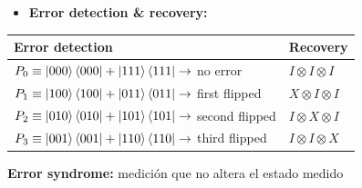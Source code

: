 \documentclass[10pt]{beamer}
\theoremstyle{remark}
\theoremstyle{definition}
\begin{document}
\begin{frame}[allowframebreaks]
    \framebreak

    \begin{itemize}
        \item \textbf{Error detection \& recovery:}
    \end{itemize}

    \begin{center}
        \begin{tabular}{ | l | l | }
            \hline
            Error detection & Recovery \\ 
            \hline
            $P_0 \equiv \ket{000}\bra{000} + \ket{111}\bra{111} \rightarrow$ no error       & $I \otimes I \otimes I$ \\
            $P_1 \equiv \ket{100}\bra{100} + \ket{011}\bra{011} \rightarrow$ first flipped  & $X \otimes I \otimes I$ \\
            $P_2 \equiv \ket{010}\bra{010} + \ket{101}\bra{101} \rightarrow$ second flipped & $I \otimes X \otimes I$ \\
            $P_3 \equiv \ket{001}\bra{001} + \ket{110}\bra{110} \rightarrow$ third flipped  & $I \otimes I \otimes X$ \\
            \hline
       \end{tabular}
    \end{center}

    \textbf{Error syndrome:} medición que no altera el estado medido
\end{frame}
\end{document}
